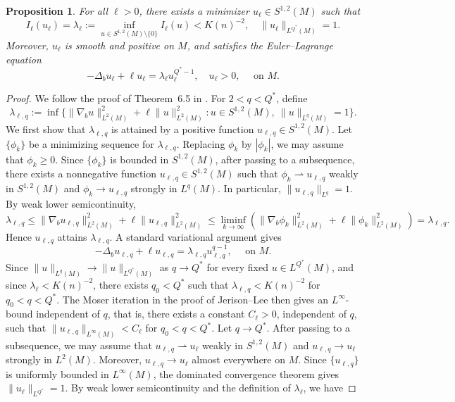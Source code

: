 \documentclass[11pt]{article}
\numberwithin{equation}{section}
\newtheorem{proposition}{Proposition}[section]
\numberwithin{equation}{section}
\begin{document}
	\begin{proposition}
		For all \(\ell>0\), there exists a minimizer \(u_\ell \in S^{1, 2}(M)\) such that
		\begin{equation}\label{eqnmin}
			I_\ell(u_\ell)=\lambda_\ell:=\inf_{u\in S^{1,2}(M)\setminus\{0\}} I_\ell(u)<K(n)^{-2},\quad\|u_\ell\|_{L^{Q^*}(M)}=1.
		\end{equation}
		Moreover, \(u_\ell\) is smooth and positive on \(M\), and satisfies the Euler--Lagrange equation
		\begin{equation}\label{eqnEL}
			-\Delta_b u_\ell+\ell u_\ell=\lambda_\ell u_\ell^{Q^*-1}, \quad u_\ell > 0, \quad \text { on } M .
		\end{equation}
	\end{proposition}
	\begin{proof}
		We follow the proof of Theorem~6.5 in \cite{JL1987}. For \(2<q<Q^*\), define
		\begin{equation}\label{infsubcritical}
			\lambda_{\ell,q}:=\inf\{\|\nabla_b u\|_{L^2(M)}^2+\ell\|u\|_{L^2(M)}^2: u\in S^{1,2}(M),\ \|u\|_{L^q(M)}=1\}.
		\end{equation}
		We first show that \(\lambda_{\ell,q}\) is attained by a positive function \(u_{\ell,q}\in S^{1,2}(M)\). Let \(\{\phi_k\}\) be a minimizing sequence for \(\lambda_{\ell,q}\). Replacing \(\phi_k\) by \(|\phi_k|\), we may assume that \(\phi_k\geq0\). Since \(\{\phi_k\}\) is bounded in \(S^{1,2}(M)\), after passing to a subsequence, there exists a nonnegative function \(u_{\ell,q} \in S^{1, 2}(M)\) such that \(\phi_k \rightharpoonup u_{\ell,q}\) weakly in \(S^{1, 2}(M)\) and \(\phi_k \to u_{\ell,q}\) strongly in \(L^q(M)\). In particular, \(\|u_{\ell,q}\|_{L^q}=1\).  By weak lower semicontinuity,
		\[
		\lambda_{\ell,q} \le\|\nabla_b u_{\ell,q}\|_{L^2(M)}^2+\ell\|u_{\ell,q}\|_{L^2(M)}^2\le\liminf_{k\to\infty}(\|\nabla_b\phi_k\|_{L^2(M)}^2+\ell\|\phi_k\|_{L^2(M)}^2)=\lambda_{\ell,q}.
		\] 
		Hence \(u_{\ell,q}\) attains \(\lambda_{\ell,q}\). A standard variational argument gives
		\begin{equation}\label{equsubcritical}
			-\Delta_b u_{\ell,q}+\ell u_{\ell,q}=\lambda_{\ell,q} u_{\ell,q}^{q-1}, \quad \text { on } M.
		\end{equation}
		Since \(\|u\|_{L^q(M)}\to\|u\|_{L^{Q^*}(M)}\) as \(q\to Q^*\) for every fixed \(u\in L^{Q^*}(M)\), and since \(\lambda_\ell<K(n)^{-2}\), there exists \(q_0<Q^*\) such that \(\lambda_{\ell,q} < K(n)^{-2}\) for \(q_0 < q < Q^*\). The Moser iteration in the proof of Jerison--Lee \cite[Theorem 6.5]{JL1987} then gives an \(L^\infty\)-bound independent of \(q\), that is, there exists a constant \(C_\ell>0\), independent of \(q\), such that \(\|u_{\ell,q}\|_{L^\infty(M)} < C_\ell\)  for \(q_0 < q < Q^*\). Let \(q\to Q^*\). After passing to a subsequence,  we may assume that \(u_{\ell,q} \rightharpoonup u_\ell\) weakly in \(S^{1, 2}(M)\) and \(u_{\ell,q} \to u_\ell\) strongly in \(L^2(M)\). Moreover, \(u_{\ell,q}\to u_\ell\) almost everywhere on \(M\). Since \(\{u_{\ell,q}\}\) is uniformly bounded in \(L^\infty(M)\), the dominated convergence theorem gives \(\|u_\ell\|_{L^{Q^*}}=1\). By weak lower semicontinuity and the definition of \(\lambda_\ell\), we have

\end{proof}
\end{document}
